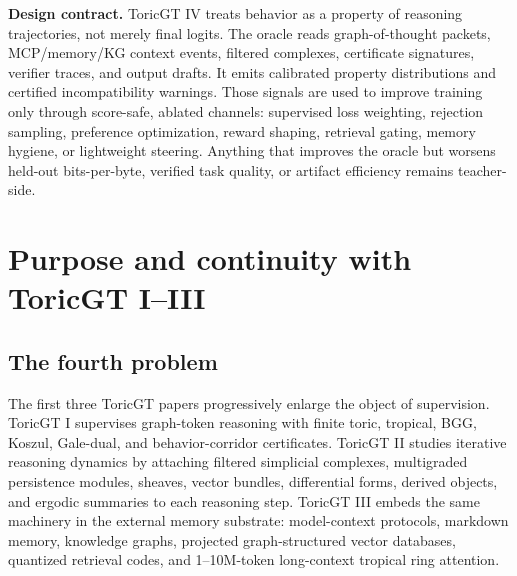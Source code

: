 \documentclass[11pt]{article}
\numberwithin{equation}{section}
\begin{document}
\begin{titlepage}
\begin{abstract}
We develop a rigorous theory of oracle trajectory classification. We define trajectory objects, property lattices, behavior sheaves, toric property polytopes, persistence-label modules, derived residuals, and calibrated multi-label distributions. We prove equivariance, proper-scoring, side-information, isotonic projection, sheaf-gluing, persistence-stability, toric-margin, oracle-guided policy-improvement, and ergodic-occupancy theorems. We then give a concrete training paradigm: label acquisition, weak supervision, verifier distillation, human/rubric calibration, contrastive trajectory pairs, bits-per-byte-gated promotion, oracle-assisted reinforcement or preference training, GFlowNet reward shaping, retrieval filtering, memory pruning, MCP tool-call gating, and test-time behavior projection. The guiding principle is unchanged: the oracle exists to improve model behavior and reasoning, not to decorate the system with attractive mathematics. A trajectory label is useful only when it predicts future bytes, improves answer quality, reduces error, improves controllability, or prevents a costly failure under auditable deployment constraints.
\end{abstract}
\vfill
\begin{minipage}{0.92\textwidth}
\textbf{Design contract.} ToricGT IV treats behavior as a property of reasoning trajectories, not merely final logits. The oracle reads graph-of-thought packets, MCP/memory/KG context events, filtered complexes, certificate signatures, verifier traces, and output drafts. It emits calibrated property distributions and certified incompatibility warnings. Those signals are used to improve training only through score-safe, ablated channels: supervised loss weighting, rejection sampling, preference optimization, reward shaping, retrieval gating, memory hygiene, or lightweight steering. Anything that improves the oracle but worsens held-out bits-per-byte, verified task quality, or artifact efficiency remains teacher-side.
\end{minipage}
\end{titlepage}
\tableofcontents
\clearpage

\section{Purpose and continuity with ToricGT I--III}
\subsection{The fourth problem}
The first three ToricGT papers progressively enlarge the object of supervision. ToricGT I supervises graph-token reasoning with finite toric, tropical, BGG, Koszul, Gale-dual, and behavior-corridor certificates. ToricGT II studies iterative reasoning dynamics by attaching filtered simplicial complexes, multigraded persistence modules, sheaves, vector bundles, differential forms, derived objects, and ergodic summaries to each reasoning step. ToricGT III embeds the same machinery in the external memory substrate: model-context protocols, markdown memory, knowledge graphs, projected graph-structured vector databases, quantized retrieval codes, and 1--10M-token long-context tropical ring attention.
\end{document}

